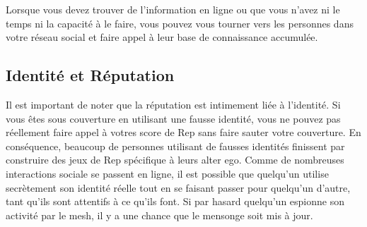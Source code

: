 Lorsque vous devez trouver de l'information en ligne ou que vous n'avez ni le temps ni la capacité à le faire, vous pouvez vous tourner vers les personnes dans votre réseau social et faire appel à leur base de connaissance accumulée. 

\subsection{Identité et Réputation} 

Il est important de noter que la réputation est intimement liée à l'identité. Si vous êtes sous couverture en utilisant une fausse identité, vous ne pouvez pas réellement faire appel à votres score de Rep sans faire sauter votre couverture. En conséquence, beaucoup de personnes utilisant de fausses identités finissent par construire des jeux de Rep spécifique à leurs alter ego. Comme de nombreuses interactions sociale se passent en ligne, il est possible que quelqu'un utilise secrètement son identité réelle tout en se faisant passer pour quelqu'un d'autre, tant qu'ils sont attentifs à ce qu'ils font. Si par hasard quelqu'un espionne son activité par le mesh, il y a une chance que le mensonge soit mis à jour. 

